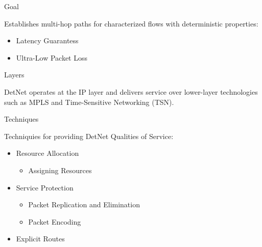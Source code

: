 \documentclass{beamer}
\begin{document}
\begin{frame}{}
  \begin{block}{Goal}
    \par
    Establishes multi-hop paths for characterized flows with deterministic properties:
    \begin{itemize}
      \item Latency Guarantess
      \item Ultra-Low Packet Loss
    \end{itemize}
  \end{block}

  \begin{block}{Layers}
    \par
    DetNet operates at the IP layer and delivers service over lower-layer technologies such as MPLS and Time-Sensitive Networking (TSN).
  \end{block}
\end{frame}

\begin{frame}{Techniques}
  \par
  Techniquies for providing DetNet Qualities of Service:~\cite{Finn2019}
  \begin{itemize}
    \item Resource Allocation
      \begin{itemize}
        \item Assigning Resources
      \end{itemize}
    \item Service Protection
      \begin{itemize}
        \item Packet Replication and Elimination
        \item Packet Encoding
      \end{itemize}
    \item Explicit Routes
  \end{itemize}
\end{frame}

\begin{frame}{}
  \printbibliography%
\end{frame}
\end{document}
